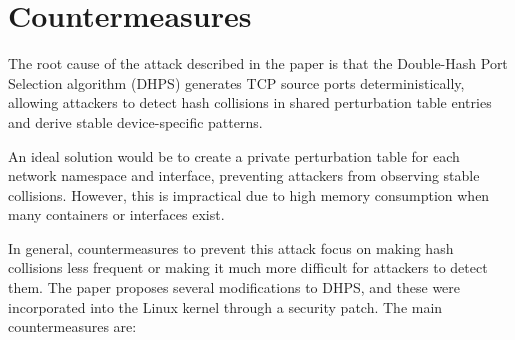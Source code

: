 \documentclass{report}
\begin{document}
%
%
%

\vspace{0.5cm}
\chapter{Countermeasures}
\label{sec:countermeasures}

The \alert{root cause} of the attack described in the paper is that the Double-Hash Port Selection algorithm (DHPS) generates TCP source ports deterministically, allowing attackers to detect hash collisions in shared perturbation table entries and derive stable device-specific patterns.

An \alert{ideal solution} would be to create a private perturbation table for each network namespace and interface, preventing attackers from observing stable collisions. However, this is impractical due to high memory consumption when many containers or interfaces exist.

In \alert{general}, \alert{countermeasures} to prevent this attack focus on making hash collisions less frequent or making it much more difficult for attackers to detect them. The paper proposes several modifications to DHPS, and these were incorporated into the Linux kernel through a security patch. The main countermeasures are:
\end{document}
